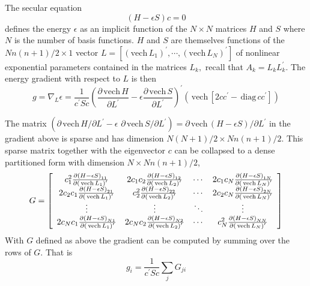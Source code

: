 \documentclass[12pt]{article}
\begin{document}
The secular equation
\begin{equation}
\left(  H-\epsilon S\right)  c=0
\end{equation}
defines the energy $\epsilon$ as an implicit function of the $N\times N$
matrices $H$ and $S$ where $N$ is the number of basis functions. $H$ and $S$
are themselves functions of the $Nn\left(  n+1\right)  /2\times1$ vector
$L=\left[  \left(  \mathrm{vech}\,L_{1}\right)  ^{\prime},\cdots,\left(
\mathrm{vech}\,L_{N}\right)  ^{\prime}\right]  $ of nonlinear exponential
parameters contained in the matrices $L_{k},$ recall that $A_{k}=L_{k}%
L_{k}^{\prime}$. The energy gradient with respect to $L$ is then
\begin{equation}
g=\nabla_{L}\epsilon=\frac{1}{c^{\prime}Sc}\left(  \frac{\partial
\,\mathrm{vech}\,H}{\partial L^{\prime}}-\epsilon\frac{\partial\,\mathrm{vech}%
\,S}{\partial L^{\prime}}\right)  ^{\prime}\left(  \,\mathrm{vech}\,\left[
2cc^{\prime}-\,\mathrm{diag}\,cc^{\prime}\right]  \right) \label{grad}%
\end{equation}

The matrix $\left(  \partial\,\mathrm{vech}\,H/\partial L^{\prime}%
-\epsilon\,\,\partial\,\mathrm{vech}\,S/\partial L^{\prime}\right)
=\partial\,\mathrm{vech}\,\left(  H-\epsilon S\right)  /\partial L^{\prime}$
in the gradient above is sparse and has dimension $N\left(  N+1\right)
/2\times Nn\left(  n+1\right)  /2$. This sparse matrix together with the
eigenvector $c$ can be collapsed to a dense partitioned form with dimension
$N\times Nn\left(  n+1\right)  /2$,
\begin{equation}
G=\left[
\begin{array}
[c]{cccc}%
c_{1}^{2}\frac{\partial\left(  H-\epsilon S\right)  _{11}}{\partial\left(
\,\mathrm{vech}\,L_{1}\right)  ^{\prime}} & 2c_{1}c_{2}\frac{\partial\left(
H-\epsilon S\right)  _{12}}{\partial\left(  \,\mathrm{vech}\,L_{2}\right)
^{\prime}} & \cdots & 2c_{1}c_{N}\frac{\partial\left(  H-\epsilon S\right)
_{1N}}{\partial\left(  \,\mathrm{vech}\,L_{N}\right)  ^{\prime}}\\
2c_{2}c_{1}\frac{\partial\left(  H-\epsilon S\right)  _{21}}{\partial\left(
\,\mathrm{vech}\,L_{1}\right)  ^{\prime}} & c_{2}^{2}\frac{\partial\left(
H-\epsilon S\right)  _{22}}{\partial\left(  \,\mathrm{vech}\,L_{2}\right)
^{\prime}} & \cdots & 2c_{2}c_{N}\frac{\partial\left(  H-\epsilon S\right)
_{2N}}{\partial\left(  \,\mathrm{vech}\,L_{N}\right)  ^{\prime}}\\
\vdots & \vdots & \ddots & \vdots\\
2c_{N}c_{1}\frac{\partial\left(  H-\epsilon S\right)  _{N1}}{\partial\left(
\,\mathrm{vech}\,L_{1}\right)  ^{\prime}} & 2c_{N}c_{2}\frac{\partial\left(
H-\epsilon S\right)  _{N2}}{\partial\left(  \,\mathrm{vech}\,L_{2}\right)
^{\prime}} & \cdots &  c_{N}^{2}\frac{\partial\left(  H-\epsilon S\right)
_{NN}}{\partial\left(  \,\mathrm{vech}\,L_{N}\right)  ^{\prime}}%
\end{array}
\right]
\end{equation}
With $G$ defined as above the gradient can be computed by summing over the
rows of $G$. That is
\[
g_{i}=\frac{1}{c^{\prime}Sc}\sum_{j}G_{ji}%
\]
\end{document}
